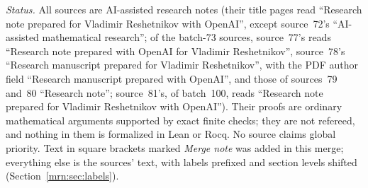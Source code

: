 \documentclass[11pt,a4paper]{article}
\theoremstyle{remark}\newtheorem{remark}[theorem]{Remark}
\begin{document}
\emph{Status.} All sources are AI-assisted research notes (their title pages
read ``Research note prepared for Vladimir Reshetnikov with OpenAI'', except
source~72's ``AI-assisted mathematical research''; of the batch-73
sources, source~77's reads ``Research note prepared with OpenAI for Vladimir
Reshetnikov'', source~78's ``Research manuscript prepared for Vladimir
Reshetnikov'', with the PDF author field ``Research manuscript prepared with
OpenAI'', and those of sources~79 and~80 ``Research note''; source~81's, of
batch~100, reads ``Research note prepared for Vladimir Reshetnikov with
OpenAI''). Their proofs are ordinary
mathematical arguments supported by exact finite checks; they are not
refereed, and nothing in them is formalized in Lean or Rocq. No source claims
global priority. Text in square brackets marked \emph{Merge note} was added
in this merge; everything else is the sources' text, with labels prefixed
and section levels shifted (Section~\ref{mrn:sec:labels}).
\end{document}
